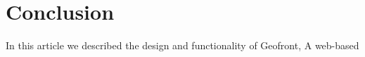 \chapter{Conclusion}

In this article we described the design and functionality of Geofront, A web-based 

